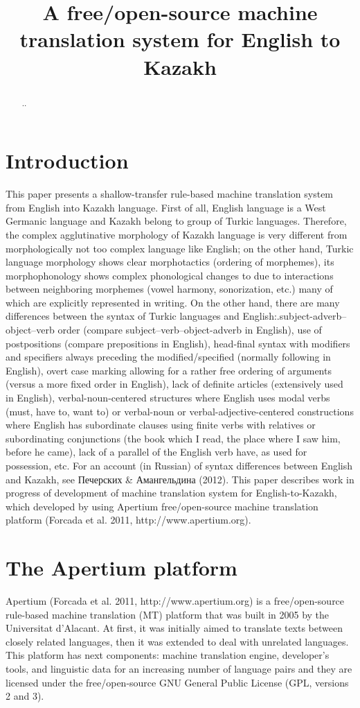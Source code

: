 \documentclass[11pt]{article}
\title{A free/open-source machine translation system for English to Kazakh}
\date{}
\begin{document}
\maketitle 

\begin{abstract}
..
\end{abstract}

\section{Introduction}

This paper presents a shallow-transfer rule-based machine translation system from English into Kazakh language. First of all, English language is a West Germanic language and Kazakh belong to group of Turkic languages. Therefore, the complex agglutinative morphology of Kazakh language is very different from morphologically not too complex language like English; on the other hand, Turkic language morphology shows clear morphotactics (ordering of morphemes), its morphophonology shows complex phonological changes to due to interactions between neighboring morphemes (vowel harmony, sonorization, etc.) many of which are explicitly represented in writing.
On the other hand, there are many differences between the syntax of Turkic languages and English:.subject-adverb–object–verb order (compare subject–verb–object-adverb in English), use of postpositions (compare prepositions in English), head-final syntax with modifiers and specifiers always preceding the modified/specified (normally following in English), overt case marking allowing for a rather free ordering of arguments (versus a more fixed order in English), lack of definite articles (extensively used in English), verbal-noun-centered structures where English uses modal verbs (must, have to, want to) or verbal-noun or verbal-adjective-centered constructions where English has subordinate clauses using finite verbs with relatives or subordinating conjunctions (the book which I read, the place where I saw him, before he came), lack of a parallel of the English verb have, as used for possession, etc. For an account (in Russian) of syntax differences between English and Kazakh, see Печерских & Амангельдина (2012).
This paper describes work in progress of development of machine translation system for English-to-Kazakh, which developed by using Apertium free/open-source machine translation platform (Forcada et al. 2011, http://www.apertium.org). 

\section{The Apertium platform}
Apertium (Forcada et al. 2011, http://www.apertium.org) is a free/open-source rule-based machine translation (MT) platform that was built in 2005 by the Universitat d’Alacant. At first, it was initially aimed to translate texts between closely related languages, then it was extended to deal with unrelated languages. This platform has next components: machine translation engine, developer’s tools, and linguistic data for an increasing number of language pairs and they are licensed under the free/open-source GNU General Public License (GPL, versions 2 and 3).
\end{document}
